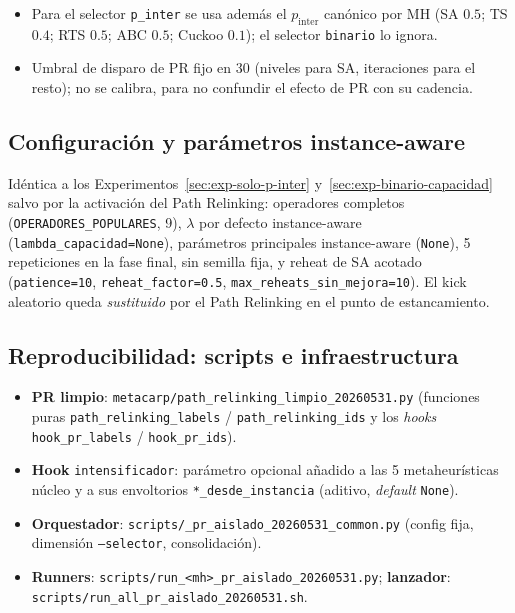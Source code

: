 \begin{itemize}
\item Para el selector \texttt{p\_inter} se usa además el $p_{\text{inter}}$
  canónico por MH (SA $0.5$; TS $0.4$; RTS $0.5$; ABC $0.5$; Cuckoo $0.1$);
  el selector \texttt{binario} lo ignora.
\item Umbral de disparo de PR fijo en $30$ (niveles para SA, iteraciones para el
  resto); no se calibra, para no confundir el efecto de PR con su cadencia.
\end{itemize}

\subsection{Configuración y parámetros instance-aware}

Idéntica a los Experimentos~\ref{sec:exp-solo-p-inter}
y~\ref{sec:exp-binario-capacidad} salvo por la activación del Path Relinking:
operadores completos (\texttt{OPERADORES\_POPULARES}, 9), $\lambda$ por defecto
instance-aware (\texttt{lambda\_capacidad=None}), parámetros principales
instance-aware (\texttt{None}), 5 repeticiones en la fase final, sin semilla
fija, y reheat de SA acotado (\texttt{patience=10}, \texttt{reheat\_factor=0.5},
\texttt{max\_reheats\_sin\_mejora=10}). El kick aleatorio queda \emph{sustituido}
por el Path Relinking en el punto de estancamiento.

\subsection{Reproducibilidad: scripts e infraestructura}

\begin{itemize}
\item \textbf{PR limpio}: \texttt{metacarp/path\_relinking\_limpio\_20260531.py}
  (funciones puras \texttt{path\_relinking\_labels} / \texttt{path\_relinking\_ids}
  y los \emph{hooks} \texttt{hook\_pr\_labels} / \texttt{hook\_pr\_ids}).
\item \textbf{Hook} \texttt{intensificador}: parámetro opcional añadido a las 5
  metaheurísticas núcleo y a sus envoltorios \texttt{*\_desde\_instancia}
  (aditivo, \emph{default} \texttt{None}).
\item \textbf{Orquestador}: \texttt{scripts/\_pr\_aislado\_20260531\_common.py}
  (config fija, dimensión \texttt{--selector}, consolidación).
\item \textbf{Runners}: \texttt{scripts/run\_<mh>\_pr\_aislado\_20260531.py};
  \textbf{lanzador}: \texttt{scripts/run\_all\_pr\_aislado\_20260531.sh}.
\end{itemize}


